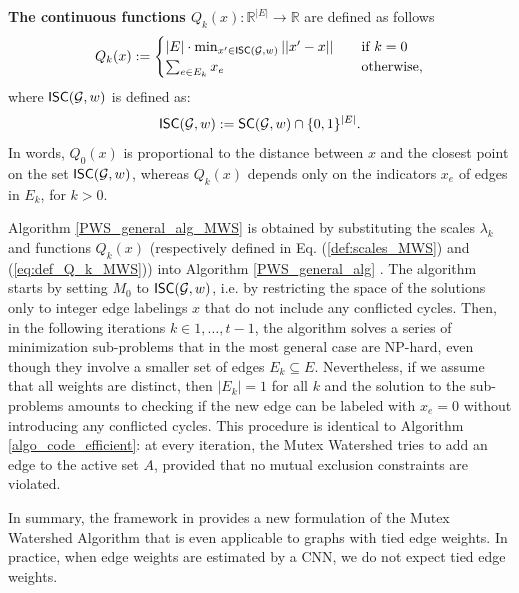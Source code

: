\noindent \textbf{The continuous functions $Q_k(x): \mathbb{R}^{|E|} \rightarrow \mathbb{R}$} are defined as follows
\begin{equation}
Q_k(x) := 
\begin{cases}
|E|\cdot \min_{x' \in \mathsf{ISC}(\mathcal{G},w)} ||x'-x|| \quad & \text{if } k=0\\
\sum_{e\in E_k} x_e & \text{otherwise,}\\
\end{cases} \label{eq:def_Q_k_MWS}
\end{equation}
where $\mathsf{ISC}(\mathcal{G},w)$ is defined as:
\begin{equation}
\mathsf{\intSC}(\mathcal{G},w) := \mathsf{SC}(\mathcal{G},w) \cap \{0,1\}^{|E|}. \label{def:\intSC}
\end{equation}
In words, $Q_0(x)$ is proportional to the distance between $x$ and the closest point on the set $\mathsf{ISC}(\mathcal{G},w)$, whereas $Q_k(x)$ depends only on the indicators $x_e$ of edges in $E_k$, for $k>0$. 


Algorithm \ref{PWS_general_alg_MWS} is obtained by substituting the scales $\lambda_k$ and functions $Q_k(x)$ (respectively defined in Eq. (\ref{def:scales_MWS}) and (\ref{eq:def_Q_k_MWS})) into Algorithm \ref{PWS_general_alg} .  
The algorithm starts by setting $M_0$ to $\mathsf{ISC}(\mathcal{G},w)$, i.e. by restricting the space of the solutions only to integer edge labelings $x$ that do not include any conflicted cycles. Then, in the following iterations $k \in 1, \ldots,t-1 $, the algorithm solves a series of minimization sub-problems that in the most general case are NP-hard, even though they involve a smaller set of edges $E_k\subseteq E$. 
Nevertheless, if we assume that all weights are distinct, then $|E_k|=1$ for all $k$ and the solution to the sub-problems amounts to checking if the new edge can be labeled with $x_e=0$ without introducing any conflicted cycles. This procedure is identical to Algorithm \ref{algo_code_efficient}: at every iteration, the Mutex Watershed tries to add an edge to the active set $A$, provided that no mutual exclusion constraints are violated. 

In summary, the framework in \cite{najman2017extending} provides a new formulation of the Mutex Watershed Algorithm that is even applicable to graphs with tied edge weights. In practice, when edge weights are estimated by a CNN, we do not expect tied edge weights.


